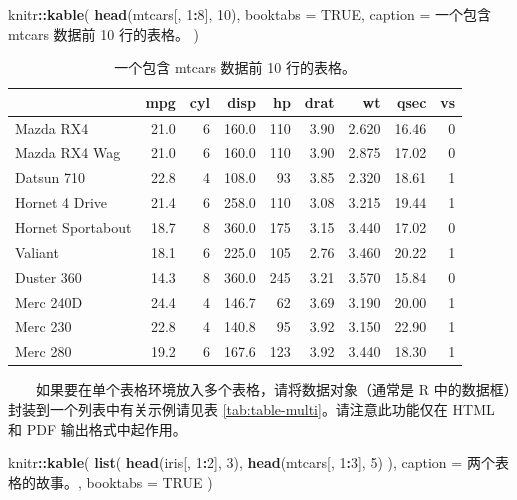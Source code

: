 \documentclass[
  12pt,
]{krantz}
\newenvironment{Shaded}{\begin{snugshade}}{\end{snugshade}}
\newcommand{\AttributeTok}[1]{\textcolor[rgb]{0.13,0.29,0.53}{#1}}
\newcommand{\ConstantTok}[1]{\textcolor[rgb]{0.56,0.35,0.01}{#1}}
\newcommand{\DecValTok}[1]{\textcolor[rgb]{0.00,0.00,0.81}{#1}}
\newcommand{\FunctionTok}[1]{\textcolor[rgb]{0.13,0.29,0.53}{\textbf{#1}}}
\newcommand{\NormalTok}[1]{#1}
\newcommand{\SpecialCharTok}[1]{\textcolor[rgb]{0.81,0.36,0.00}{\textbf{#1}}}
\newcommand{\StringTok}[1]{\textcolor[rgb]{0.31,0.60,0.02}{#1}}
\theoremstyle{definition}
\theoremstyle{definition}
\theoremstyle{definition}
\theoremstyle{definition}
\theoremstyle{remark}
\begin{document}
\begin{Shaded}
\begin{Highlighting}[]
\NormalTok{knitr}\SpecialCharTok{::}\FunctionTok{kable}\NormalTok{(}
  \FunctionTok{head}\NormalTok{(mtcars[, }\DecValTok{1}\SpecialCharTok{:}\DecValTok{8}\NormalTok{], }\DecValTok{10}\NormalTok{), }\AttributeTok{booktabs =} \ConstantTok{TRUE}\NormalTok{,}
  \AttributeTok{caption =} \StringTok{\textquotesingle{}一个包含 mtcars 数据前 10 行的表格。\textquotesingle{}}
\NormalTok{)}
\end{Highlighting}
\end{Shaded}

\begin{table}

\caption{\label{tab:table-single}一个包含 mtcars 数据前 10 行的表格。}
\centering
\begin{tabular}[t]{lrrrrrrrr}
\toprule
  & mpg & cyl & disp & hp & drat & wt & qsec & vs\\
\midrule
Mazda RX4 & 21.0 & 6 & 160.0 & 110 & 3.90 & 2.620 & 16.46 & 0\\
Mazda RX4 Wag & 21.0 & 6 & 160.0 & 110 & 3.90 & 2.875 & 17.02 & 0\\
Datsun 710 & 22.8 & 4 & 108.0 & 93 & 3.85 & 2.320 & 18.61 & 1\\
Hornet 4 Drive & 21.4 & 6 & 258.0 & 110 & 3.08 & 3.215 & 19.44 & 1\\
Hornet Sportabout & 18.7 & 8 & 360.0 & 175 & 3.15 & 3.440 & 17.02 & 0\\
\addlinespace
Valiant & 18.1 & 6 & 225.0 & 105 & 2.76 & 3.460 & 20.22 & 1\\
Duster 360 & 14.3 & 8 & 360.0 & 245 & 3.21 & 3.570 & 15.84 & 0\\
Merc 240D & 24.4 & 4 & 146.7 & 62 & 3.69 & 3.190 & 20.00 & 1\\
Merc 230 & 22.8 & 4 & 140.8 & 95 & 3.92 & 3.150 & 22.90 & 1\\
Merc 280 & 19.2 & 6 & 167.6 & 123 & 3.92 & 3.440 & 18.30 & 1\\
\bottomrule
\end{tabular}
\end{table}

  如果要在单个表格环境放入多个表格，请将数据对象（通常是 R 中的数据框）封装到一个列表中有关示例请见表 \ref{tab:table-multi}。请注意此功能仅在 HTML 和 PDF 输出格式中起作用。

\begin{Shaded}
\begin{Highlighting}[]
\NormalTok{knitr}\SpecialCharTok{::}\FunctionTok{kable}\NormalTok{(}
  \FunctionTok{list}\NormalTok{(}
    \FunctionTok{head}\NormalTok{(iris[, }\DecValTok{1}\SpecialCharTok{:}\DecValTok{2}\NormalTok{], }\DecValTok{3}\NormalTok{),}
    \FunctionTok{head}\NormalTok{(mtcars[, }\DecValTok{1}\SpecialCharTok{:}\DecValTok{3}\NormalTok{], }\DecValTok{5}\NormalTok{)}
\NormalTok{  ),}
  \AttributeTok{caption =} \StringTok{\textquotesingle{}两个表格的故事。\textquotesingle{}}\NormalTok{, }\AttributeTok{booktabs =} \ConstantTok{TRUE}
\NormalTok{)}
\end{Highlighting}
\end{Shaded}
\end{document}

